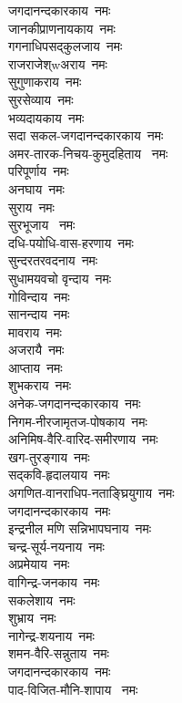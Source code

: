 \begin{flushleft}
\begin{multicols}{2}
जगदानन्दकारकाय~नमः\\
जानकीप्राणनायकाय~नमः\\
गगनाधिपसद्कुलजाय~नमः\\
राजराजेश्wअराय~नमः\\
सुगुणाकराय~नमः\\
सुरसेव्याय~नमः\\
भव्यदायकाय~नमः\\
सदा सकल-जगदानन्दकारकाय~नमः\\
अमर-तारक-निचय-कुमुदहिताय ~नमः\\
परिपूर्णाय~नमः\hfill{}\\
अनघाय~नमः\\
सुराय~नमः\\
सुरभूजाय ~नमः\\
दधि-पयोधि-वास-हरणाय~नमः\\
सुन्दरतरवदनाय~नमः\\
सुधामयवचो वृन्दाय~नमः\\
गोविन्दाय~नमः\\
सानन्दाय~नमः\\
मावराय~नमः\\
अजरायै~नमः\hfill{}\\
आप्ताय~नमः\\
शुभकराय~नमः\\
अनेक-जगदानन्दकारकाय~नमः\\
निगम-नीरजामृतज-पोषकाय~नमः\\
अनिमिष-वैरि-वारिद-समीरणाय~नमः\\
खग-तुरङ्गाय~नमः\\
सद्कवि-हृदालयाय~नमः\\
अगणित-वानराधिप-नताङ्घ्रियुगाय~नमः\\
जगदानन्दकारकाय~नमः\\
इन्द्रनील मणि सन्निभापघनाय~नमः\hfill{}\\
चन्द्र-सूर्य-नयनाय~नमः\\
अप्रमेयाय~नमः\\
वागिन्द्र-जनकाय~नमः\\
सकलेशाय~नमः\\
शुभ्राय~नमः\\
नागेन्द्र-शयनाय~नमः\\
शमन-वैरि-सन्नुताय~नमः\\
जगदानन्दकारकाय~नमः\\
पाद-विजित-मौनि-शापाय ~नमः\\

\end{multicols}
\end{flushleft}
